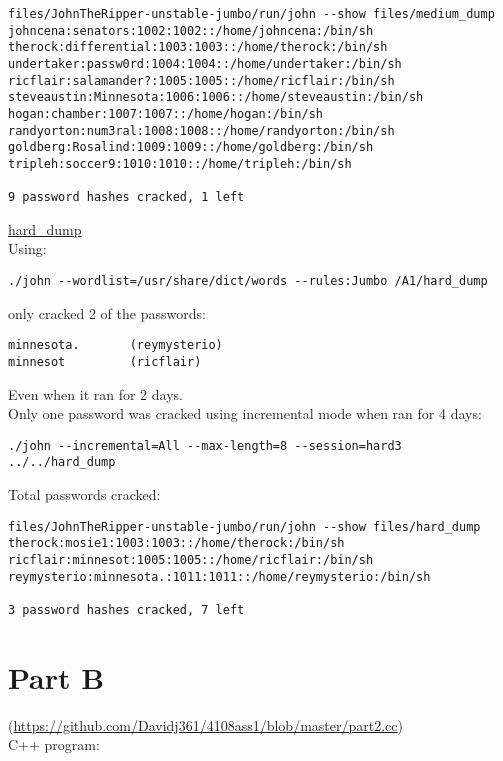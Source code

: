 \documentclass[12pt]{article}
\begin{document}
\begin{verbatim}
files/JohnTheRipper-unstable-jumbo/run/john --show files/medium_dump
johncena:senators:1002:1002::/home/johncena:/bin/sh
therock:differential:1003:1003::/home/therock:/bin/sh
undertaker:passw0rd:1004:1004::/home/undertaker:/bin/sh
ricflair:salamander?:1005:1005::/home/ricflair:/bin/sh
steveaustin:Minnesota:1006:1006::/home/steveaustin:/bin/sh
hogan:chamber:1007:1007::/home/hogan:/bin/sh
randyorton:num3ral:1008:1008::/home/randyorton:/bin/sh
goldberg:Rosalind:1009:1009::/home/goldberg:/bin/sh
tripleh:soccer9:1010:1010::/home/tripleh:/bin/sh

9 password hashes cracked, 1 left
\end{verbatim}

\underline{hard\_dump} \\

Using:
\begin{verbatim}
./john --wordlist=/usr/share/dict/words --rules:Jumbo /A1/hard_dump
\end{verbatim}
only cracked 2 of the passwords:
\begin{verbatim}
minnesota.       (reymysterio)
minnesot         (ricflair)
\end{verbatim}
Even when it ran for 2 days. \\

Only one password was cracked using incremental mode when ran for 4 days:
\begin{verbatim}
./john --incremental=All --max-length=8 --session=hard3 ../../hard_dump
\end{verbatim}

Total passwords cracked:
\begin{verbatim}
files/JohnTheRipper-unstable-jumbo/run/john --show files/hard_dump
therock:mosie1:1003:1003::/home/therock:/bin/sh
ricflair:minnesot:1005:1005::/home/ricflair:/bin/sh
reymysterio:minnesota.:1011:1011::/home/reymysterio:/bin/sh

3 password hashes cracked, 7 left
\end{verbatim}


\part*{Part B}

(\url{https://github.com/Davidj361/4108ass1/blob/master/part2.cc}) \\
C++ program: 
\end{document}
